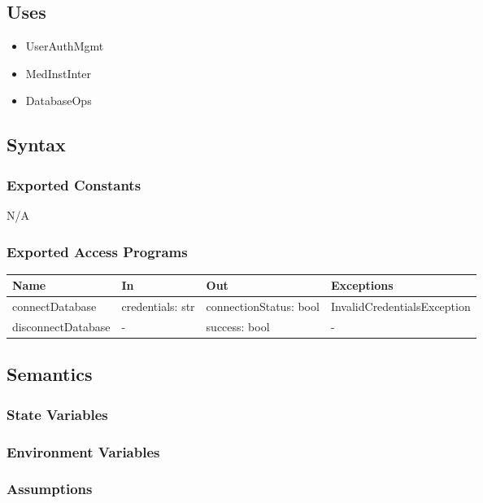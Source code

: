 \documentclass[12pt, titlepage]{article}
\begin{document}
\subsection{Uses}
\begin{itemize}
    \item UserAuthMgmt
    \item MedInstInter
    \item DatabaseOps
\end{itemize}
\subsection{Syntax}

\subsubsection{Exported Constants}
N/A
\subsubsection{Exported Access Programs}

\begin{center}
\begin{tabular}{p{3cm} p{4cm} p{4cm} p{5cm}}
\hline
\textbf{Name} & \textbf{In} & \textbf{Out} & \textbf{Exceptions} \\
\hline
connectDatabase & credentials: str & connectionStatus: bool & InvalidCredentialsException \\
disconnectDatabase & - & success: bool & - \\
\hline
\end{tabular}
\end{center}

\subsection{Semantics}

\subsubsection{State Variables}

\subsubsection{Environment Variables}

\subsubsection{Assumptions}
\end{document}
